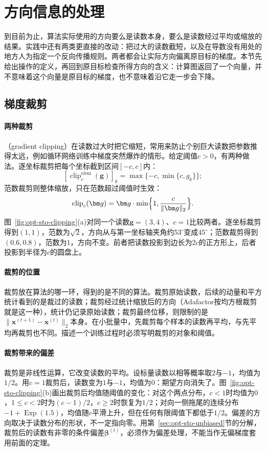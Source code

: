 \section{方向信息的处理}
\label{sec:opt-sto-direction}

到目前为止，算法实际使用的方向要么是读数本身，要么是读数经过平均或缩放的结果。实践中还有两类更直接的改动：把过大的读数截短，以及在导数没有用处的地方人为指定一个反向传播规则。两者都会让实际方向偏离原目标的梯度。本节先给出操作的定义，再回到原目标检查所得方向的含义：计算图返回了一个向量，并不意味着这个向量是原目标的梯度，也不意味着沿它走一步会下降。

\subsection{梯度裁剪}
\label{sec:opt-sto-clipping}

\paragraph{两种裁剪}
（gradient clipping）在读数过大时把它缩短，常用来防止个别巨大读数把参数推得太远，例如循环网络训练中梯度突然爆炸的情形。给定阈值$c>0$，有两种做法。逐坐标裁剪把每个坐标截到区间$[-c,c]$内：
\[
  [\operatorname{clip}^{\mathrm{elem}}_c(\bm g)]_k=\max\{-c,\min\{c,g_k\}\};
\]
范数裁剪则整体缩放，只在范数超过阈值时生效：
\[
  \operatorname{clip}_c(\bm g)=\bm g\cdot\min\Bigl\{1,\frac{c}{\lVert\bm g\rVert_2}\Bigr\}.
\]
图~\ref{fig:opt-sto-clipping}(a)对同一个读数$\bm g=(3,4)$、$c=1$比较两者。逐坐标裁剪得到$(1,1)$，范数为$\sqrt2$，方向从与第一坐标轴夹角约$53^\circ$变成$45^\circ$；范数裁剪得到$(0.6,0.8)$，范数为$1$，方向不变。前者把读数投影到边长为$2c$的正方形上，后者投影到半径为$c$的圆盘上。

\paragraph{裁剪的位置}
裁剪放在算法的哪一环，得到的是不同的算法。裁剪原始读数，后续的动量和平方统计看到的是裁过的读数；裁剪经过统计缩放后的方向（Adafactor按均方根裁剪就是这一种），统计仍记录原始读数；裁剪最终位移，则限制的是$\lVert\bm x^{(t+1)}-\bm x^{(t)}\rVert_2$本身。在小批量中，先裁剪每个样本的读数再平均，与先平均再裁剪也不同。描述一个训练过程时必须写明裁剪的对象和阈值。

\paragraph{裁剪带来的偏差}
裁剪是非线性运算，它改变读数的平均。设标量读数以相等概率取$2$与$-1$，均值为$1/2$。用$c=1$裁剪后，读数变为$1$与$-1$，均值为$0$：期望方向消失了。图~\ref{fig:opt-sto-clipping}(b)画出裁剪后均值随阈值的变化：对这个两点分布，$c<1$时均值为$0$，$1\leq c<2$时为$(c-1)/2$，$c\geq2$时恢复为$1/2$；对向一侧拖尾的连续分布$-1+\operatorname{Exp}(1.5)$，均值随$c$平滑上升，但在任何有限阈值下都低于$1/2$。偏差的方向取决于读数分布的形状，不一定指向零。用第~\ref{sec:opt-sto-unbiased}节的分解，裁剪后的读数有非零的条件偏差$\bm\beta^{(t)}$，必须作为偏差处理，不能当作无偏梯度套用前面的定理。

